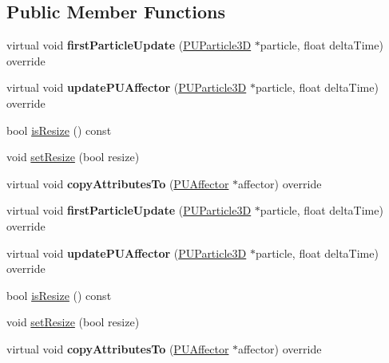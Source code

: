 \subsection*{Public Member Functions}
\begin{DoxyCompactItemize}
\item 
\mbox{\label{classPUAlignAffector_a315ceacdaa801895c48ef0a6ad81cb85}} 
virtual void {\bfseries first\+Particle\+Update} (\hyperlink{structPUParticle3D}{P\+U\+Particle3D} $\ast$particle, float delta\+Time) override
\item 
\mbox{\label{classPUAlignAffector_afbdd1ea8cd25b7df4aa60fd19328d736}} 
virtual void {\bfseries update\+P\+U\+Affector} (\hyperlink{structPUParticle3D}{P\+U\+Particle3D} $\ast$particle, float delta\+Time) override
\item 
bool \hyperlink{classPUAlignAffector_a34c0edf97481efd6f99104721ca111df}{is\+Resize} () const
\item 
void \hyperlink{classPUAlignAffector_a217e42a696450708afac9f4ba0473181}{set\+Resize} (bool resize)
\item 
\mbox{\label{classPUAlignAffector_ac3f2c8867cdaf42a24d687f774665d83}} 
virtual void {\bfseries copy\+Attributes\+To} (\hyperlink{classPUAffector}{P\+U\+Affector} $\ast$affector) override
\item 
\mbox{\label{classPUAlignAffector_abd32534649d0ade1b13f6b985d2d15ef}} 
virtual void {\bfseries first\+Particle\+Update} (\hyperlink{structPUParticle3D}{P\+U\+Particle3D} $\ast$particle, float delta\+Time) override
\item 
\mbox{\label{classPUAlignAffector_af464b9bb9e7b489936eb3b4a19333490}} 
virtual void {\bfseries update\+P\+U\+Affector} (\hyperlink{structPUParticle3D}{P\+U\+Particle3D} $\ast$particle, float delta\+Time) override
\item 
bool \hyperlink{classPUAlignAffector_a34c0edf97481efd6f99104721ca111df}{is\+Resize} () const
\item 
void \hyperlink{classPUAlignAffector_a217e42a696450708afac9f4ba0473181}{set\+Resize} (bool resize)
\item 
\mbox{\label{classPUAlignAffector_a8ab93ac7855a927a7a977d9936c70b64}} 
virtual void {\bfseries copy\+Attributes\+To} (\hyperlink{classPUAffector}{P\+U\+Affector} $\ast$affector) override
\end{DoxyCompactItemize}
